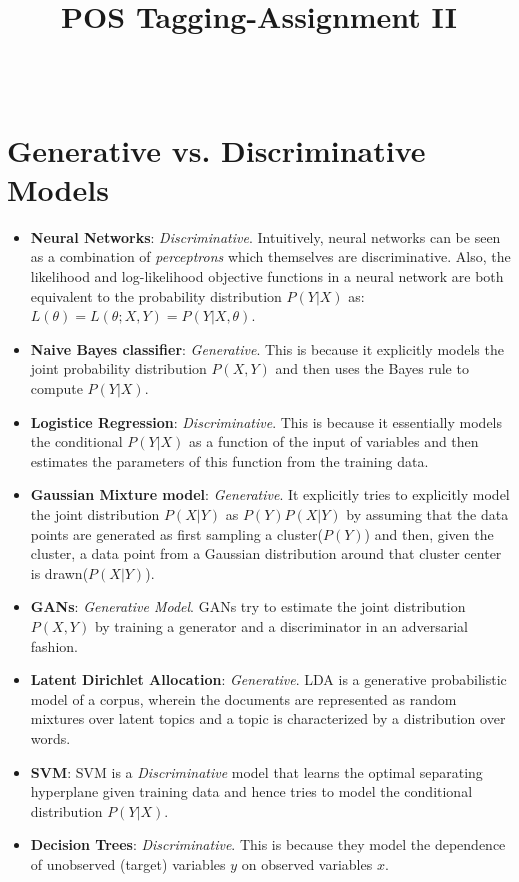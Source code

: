 \documentclass[12pt]{article}
\begin{document}
\title{\bf POS Tagging-Assignment II} 

\author{ \hfill {}\\ 
}

\maketitle



\section{Generative vs. Discriminative Models}
\begin{itemize}
    \item \textbf{Neural Networks}: \textit{Discriminative}. Intuitively, neural networks can be seen as a combination of \textit{perceptrons} which themselves are discriminative. Also, the likelihood and log-likelihood objective functions in a neural network are both equivalent to the probability distribution $P(Y|X)$ as:  $L(\theta)=L(\theta;X,Y)=P(Y|X,\theta)$.
    \item \textbf{Naive Bayes classifier}: \textit{Generative}. This is because it explicitly models the joint probability distribution $P(X,Y)$ and then uses the Bayes rule to compute $P(Y|X)$.
    \item \textbf{Logistice Regression}: \textit{Discriminative}. This is because it essentially models the conditional $P(Y|X)$ as a function of the input of variables and then estimates the parameters of this function from the training data. 
    \item \textbf{Gaussian Mixture model}: \textit{Generative}. It explicitly tries to explicitly model the joint distribution $P(X|Y)$ as $P(Y)P(X|Y)$ by assuming that the data points are generated as first sampling a cluster($P(Y)$) and then, given the cluster,  a data point from a Gaussian distribution around that cluster center is drawn($P(X|Y)$).
    \item \textbf{GANs}: \textit{Generative Model}. GANs try to estimate the joint distribution $P(X,Y)$ by training a generator and a discriminator in an adversarial fashion.
    \item \textbf{Latent Dirichlet Allocation}: \textit{Generative}. LDA is a generative probabilistic model of a corpus, wherein the documents are represented as random mixtures over latent topics and a topic is characterized by a distribution over words.
    \item \textbf{SVM}: SVM is a \textit{Discriminative} model that learns the optimal separating hyperplane given training data and hence tries to model the conditional distribution $P(Y|X)$.
    \item \textbf{Decision Trees}: \textit{Discriminative}. This is because they model the dependence of unobserved (target) variables $y$ on observed variables $x$. 
\end{itemize}
\end{document}

